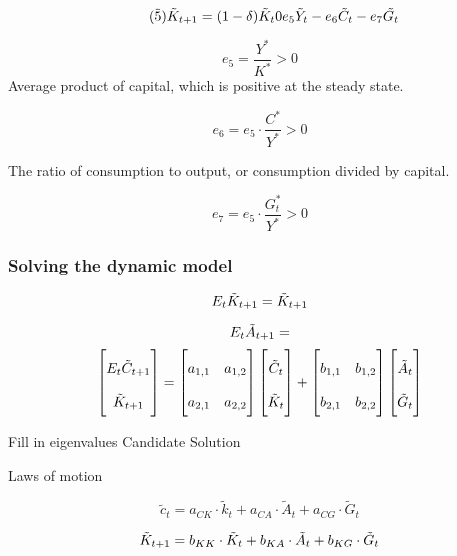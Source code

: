 \begin{equation}\tag{$\Tilde{5}$}
    \Tilde{K}_{t+1} = (1 - \delta) \Tilde{K}_t 0 e_5 \Tilde{Y}_t - e_6 \Tilde{C}_t - e_7 \Tilde{G_t}
\end{equation}

$$
e_5 = \frac{Y^*}{K^*}> 0
$$
Average product of capital, which is positive at the steady state.


$$
e_6 = e_5 \cdot \frac{C^*}{Y^*} > 0
$$

The ratio of consumption to output, or consumption divided by capital.


$$
e_7 = e_5 \cdot \frac{G^*_t}{Y^*} > 0
$$

\subsubsection*{Solving the dynamic model}


$$
E_t \Tilde{K}_{t +1} = \Tilde{K}_{t + 1}
$$

$$
E_t \Tilde{A}_{t + 1}= 
$$
\begin{equation}\label{matrix_solution}
\begingroup %
\renewcommand*{\arraystretch}{2}
\begin{bmatrix}
E_t \Tilde{C}_{t +1} \\
\Tilde{K}_{t +1} 
\end{bmatrix}
=
\begin{bmatrix}
a_{1,1} & a_{1,2} \\
a_{2,1} & a_{2,2} 
\end{bmatrix}
\begin{bmatrix}
\Tilde{C}_t \\
\Tilde{K}_{t} 
\end{bmatrix}
+
\begin{bmatrix}
b_{1,1} & b_{1,2} \\
b_{2,1} & b_{2,2} 
\end{bmatrix}
\begin{bmatrix}
\Tilde{A}_t \\
\Tilde{G}_{t} 
\end{bmatrix}
\endgroup
\end{equation}


Fill in eigenvalues Candidate Solution


Laws of motion


$$
\tilde { c } _ { t } = a _ { CK} \cdot \tilde { k } _ { t } + a_ { CA } \cdot \tilde { A } _ { t } + a _ { CG } \cdot \tilde { G } _ { t }
$$

$$
\Tilde{K}_{t + 1} = b_{KK} \cdot \Tilde{K}_t + b_{KA} \cdot \Tilde{A}_t + b_{KG} \cdot \Tilde{G}_t
$$

